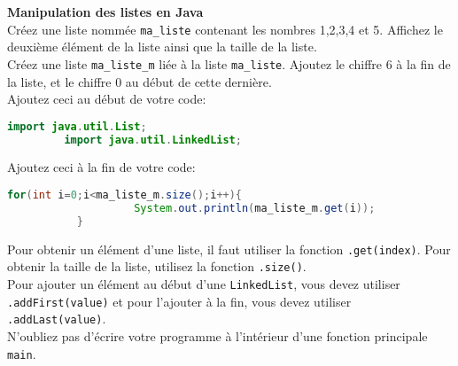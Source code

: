 	\begin{Exercice}[10 minutes] \textbf{Manipulation des listes en Java}\\
      	Créez une liste nommée \lstinline{ma_liste} contenant les nombres 1,2,3,4 et 5. Affichez le deuxième élément de la liste ainsi que la taille de la liste. \\
      	
      	Créez une liste \lstinline{ma_liste_m} liée à la liste \lstinline{ma_liste}. Ajoutez le chiffre 6 à la fin de la liste, et le chiffre 0 au début de cette dernière. \\
      	
      	Ajoutez ceci au début de votre code:
      	\begin{lstlisting}[language=Java]
             import java.util.List;
	     import java.util.LinkedList; \end{lstlisting}
	     
	     Ajoutez ceci à la fin de votre code:
	     
	    \begin{lstlisting}[language=Java]
             for(int i=0;i<ma_liste_m.size();i++){
            		System.out.println(ma_liste_m.get(i));
	       } \end{lstlisting} 
    
        \begin{conseil}
            Pour obtenir un élément d'une liste, il faut utiliser la fonction \lstinline{.get(index)}. Pour obtenir la taille de la liste, utilisez la fonction \lstinline{.size()}. \\
            
            Pour ajouter un élément au début d'une \lstinline{LinkedList}, vous devez utiliser \lstinline{.addFirst(value)} et pour l'ajouter à la fin, vous devez utiliser \lstinline{.addLast(value)}. \\
            
           	N'oubliez pas d'écrire votre programme à l'intérieur d'une fonction principale \lstinline{main}. \\
           	
           	
		     
        \end{conseil}
        
        \begin{solution}
            
        \end{solution}
    \end{Exercice}
    
